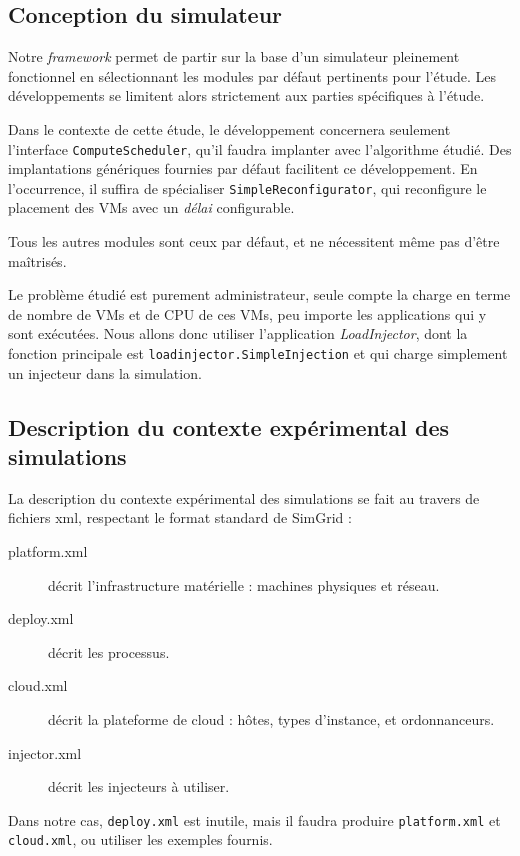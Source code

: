 \documentclass[parallelisme]{compas2017}
\newcommand\smalltt[1]{\texttt{\small #1}}
\begin{document}
\subsection{Conception du simulateur}

Notre \textit{framework} permet de partir sur la base d'un simulateur pleinement 
fonctionnel en sélectionnant les modules par défaut pertinents pour l'étude. 
Les développements se limitent alors strictement aux parties spécifiques à 
l'étude.

Dans le contexte de cette étude, le développement concernera seulement 
l'interface \smalltt{ComputeScheduler}, qu'il faudra implanter avec l'algorithme 
étudié. Des implantations génériques fournies par défaut facilitent ce 
développement. En l'occurrence, il suffira de spécialiser 
\smalltt{SimpleReconfigurator}, qui reconfigure le placement des VMs avec un 
\emph{délai} configurable.

Tous les autres modules sont ceux par défaut, et ne nécessitent même pas d'être 
maîtrisés.

Le problème étudié est purement administrateur, seule compte la charge en terme 
de nombre de VMs et de CPU de ces VMs, peu importe les applications qui y sont 
exécutées. Nous allons donc utiliser l'application \emph{LoadInjector}, dont la 
fonction principale est \smalltt{loadinjector.SimpleInjection} et qui charge 
simplement un injecteur dans la simulation.

\subsection{Description du contexte expérimental des simulations}

La description du contexte expérimental des simulations se fait au travers de 
fichiers xml, respectant le format standard de SimGrid :

\begin{description}
	\item[platform.xml] décrit l'infrastructure matérielle : machines 
physiques et réseau.
	\item[deploy.xml] décrit les processus.
	\item[cloud.xml] décrit la plateforme de cloud : hôtes,
types d'instance, et ordonnanceurs.
	\item[injector.xml] décrit les injecteurs à utiliser.
\end{description}

Dans notre cas, \smalltt{deploy.xml} est inutile, mais il faudra produire 
\smalltt{platform.xml} et \smalltt{cloud.xml}, ou utiliser les exemples fournis.
\end{document}
